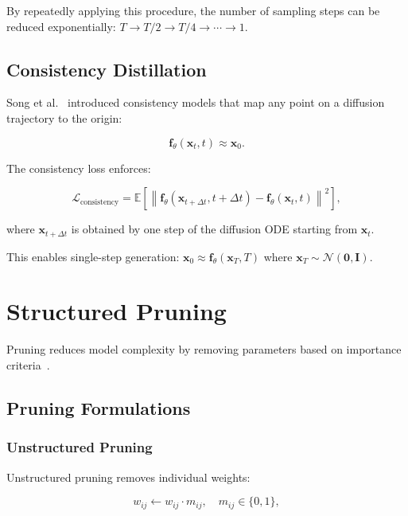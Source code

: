 \documentclass[12pt]{report}
\theoremstyle{definition}
\newcommand{\E}{\mathbb{E}}
\newcommand{\N}{\mathcal{N}}
\newcommand{\loss}{\mathcal{L}}
\newcommand{\norm}[1]{\left\| #1 \right\|}
\begin{document}
By repeatedly applying this procedure, the number of sampling steps can be reduced exponentially: $T \to T/2 \to T/4 \to \cdots \to 1$.

\subsection{Consistency Distillation}

Song et al.~\citep{song2023consistency} introduced consistency models that map any point on a diffusion trajectory to the origin:

\begin{equation}
\mathbf{f}_\theta(\mathbf{x}_t, t) \approx \mathbf{x}_0.
\label{eq:consistency_map}
\end{equation}

The consistency loss enforces:

\begin{equation}
\loss_{\text{consistency}} = \E\left[\norm{\mathbf{f}_\theta(\mathbf{x}_{t+\Delta t}, t+\Delta t) - \mathbf{f}_\theta(\mathbf{x}_t, t)}^2\right],
\label{eq:consistency_loss}
\end{equation}

where $\mathbf{x}_{t+\Delta t}$ is obtained by one step of the diffusion ODE starting from $\mathbf{x}_t$.

This enables single-step generation: $\mathbf{x}_0 \approx \mathbf{f}_\theta(\mathbf{x}_T, T)$ where $\mathbf{x}_T \sim \N(\mathbf{0}, \mathbf{I})$.

\section{Structured Pruning}

Pruning reduces model complexity by removing parameters based on importance criteria~\citep{lecun1990optimal, han2015learning}.

\subsection{Pruning Formulations}

\subsubsection{Unstructured Pruning}

Unstructured pruning removes individual weights:

\begin{equation}
w_{ij} \leftarrow w_{ij} \cdot m_{ij}, \quad m_{ij} \in \{0, 1\},
\label{eq:unstructured_prune}
\end{equation}
\end{document}
